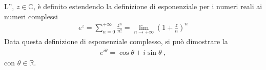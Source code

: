 \documentclass[letterpaper,10pt,italian]{jupyterBook}
\begin{document}
\sphinxAtStartPar
L”, \(z \in \mathbb{C}\), è definito estendendo la definizione di esponenziale per i numeri reali ai numeri complessi
\begin{equation}\label{equation:ch/algebra/complex-algebra:complex:complex-exp}
\begin{split}e^z = \sum_{n = 0}^{+\infty} \frac{z^n}{n!} = \lim_{n \rightarrow +\infty} \left( 1 + \frac{z}{n} \right)^n\end{split}
\end{equation}
\sphinxAtStartPar
Data questa definizione di esponenziale complesso, si può dimostrare la 
\begin{equation*}
\begin{split}e^{i \theta} = \cos \theta + i \sin \theta \ ,\end{split}
\end{equation*}
\sphinxAtStartPar
con \(\theta \in \mathbb{R}\).
\end{document}

